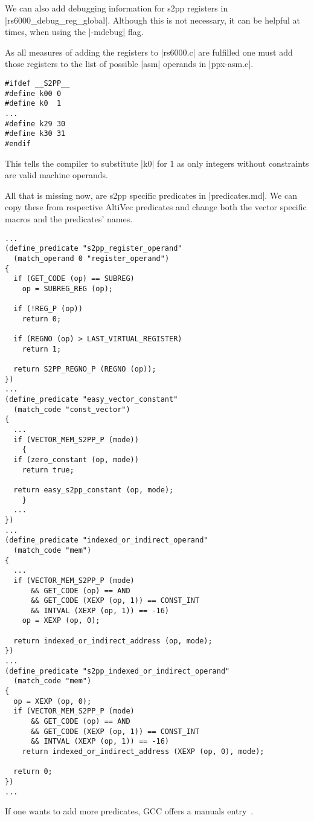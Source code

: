 We can also add debugging information for s2pp registers in |rs6000_debug_reg_global|.
Although this is not necessary, it can be helpful at times, when using the |-mdebug| flag.

As all measures of adding the registers to |rs6000.c| are fulfilled one must add those registers to the list of possible |asm| operands in |ppx-asm.c|.
\begin{lstlisting}
#ifdef __S2PP__
#define k00 0
#define k0  1
...
#define k29 30
#define k30 31
#endif
\end{lstlisting}
This tells the compiler to substitute |k0| for 1 as only integers without constraints are valid machine operands.

All that is missing now, are s2pp specific predicates in |predicates.md|.
We can copy these from respective AltiVec predicates and change both the vector specific macros and the predicates' names.
\begin{lstlisting}
...
(define_predicate "s2pp_register_operand"
  (match_operand 0 "register_operand")
{
  if (GET_CODE (op) == SUBREG)
    op = SUBREG_REG (op);

  if (!REG_P (op))
    return 0;

  if (REGNO (op) > LAST_VIRTUAL_REGISTER)
    return 1;

  return S2PP_REGNO_P (REGNO (op));
})
...
(define_predicate "easy_vector_constant"
  (match_code "const_vector")
{
  ...
  if (VECTOR_MEM_S2PP_P (mode))
    {
  if (zero_constant (op, mode))
    return true;

  return easy_s2pp_constant (op, mode);
    }
  ...
})
...
(define_predicate "indexed_or_indirect_operand"
  (match_code "mem")
{
  ...
  if (VECTOR_MEM_S2PP_P (mode)
      && GET_CODE (op) == AND
      && GET_CODE (XEXP (op, 1)) == CONST_INT
      && INTVAL (XEXP (op, 1)) == -16)
    op = XEXP (op, 0);

  return indexed_or_indirect_address (op, mode);
})
...
(define_predicate "s2pp_indexed_or_indirect_operand"
  (match_code "mem")
{
  op = XEXP (op, 0);
  if (VECTOR_MEM_S2PP_P (mode)
      && GET_CODE (op) == AND
      && GET_CODE (XEXP (op, 1)) == CONST_INT
      && INTVAL (XEXP (op, 1)) == -16)
    return indexed_or_indirect_address (XEXP (op, 0), mode);

  return 0;
})
...    
\end{lstlisting}
If one wants to add more predicates, \ac{GCC} offers a manuals entry~\citep[ch.~16.7]{GCCint}.

